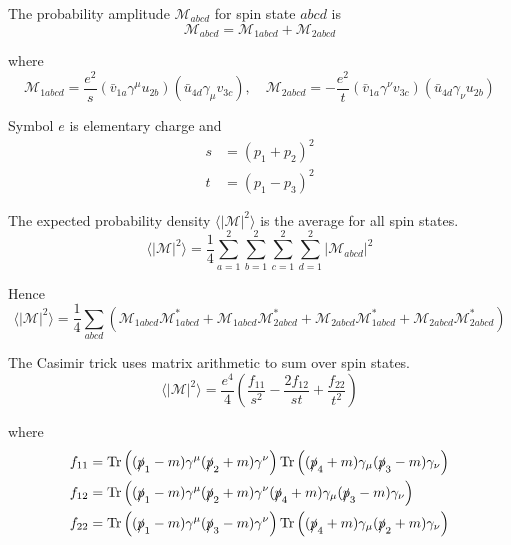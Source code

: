 The probability amplitude $\mathcal M_{abcd}$ for spin state $abcd$ is
\begin{equation*}
\mathcal M_{abcd}=\mathcal M_{1abcd}+\mathcal M_{2abcd}
\end{equation*}

where
\begin{equation*}
\mathcal M_{1abcd}=\frac{e^2}{s}(\bar v_{1a}\gamma^\mu u_{2b})(\bar u_{4d}\gamma_\mu v_{3c}),
\quad
\mathcal M_{2abcd}=-\frac{e^2}{t}(\bar v_{1a}\gamma^\nu v_{3c})(\bar u_{4d}\gamma_\nu u_{2b})
\end{equation*}

Symbol $e$ is elementary charge and
\begin{align*}
s&=(p_1+p_2)^2
\\
t&=(p_1-p_3)^2
\end{align*}

The expected probability density $\langle|\mathcal M|^2\rangle$
is the average for all spin states.
\begin{equation*}
\langle|\mathcal M|^2\rangle=\frac{1}{4}
\sum_{a=1}^2\sum_{b=1}^2\sum_{c=1}^2\sum_{d=1}^2
|\mathcal M_{abcd}|^2
\end{equation*}

Hence
\begin{equation*}
\langle|\mathcal{M}|^2\rangle=\frac{1}{4}
\sum_{abcd}
\left(
\mathcal M_{1abcd}\mathcal M_{1abcd}^*
+\mathcal M_{1abcd}\mathcal M_{2abcd}^*
+\mathcal M_{2abcd}\mathcal M_{1abcd}^*
+\mathcal M_{2abcd}\mathcal M_{2abcd}^*
\right)
\end{equation*}

The Casimir trick uses matrix arithmetic to sum over spin states.
\begin{equation*}
\langle|\mathcal{M}|^2\rangle
=\frac{e^4}{4}
\left(
\frac{f_{11}}{s^2}-\frac{2f_{12}}{st}+\frac{f_{22}}{t^2}
\right)
\end{equation*}

where
\begin{align*}
f_{11}&=\operatorname{Tr}\left(
(\slashed p_1-m)\gamma^\mu(\slashed p_2+m)\gamma^\nu
\right)
\operatorname{Tr}\left(
(\slashed p_4+m)\gamma_\mu(\slashed p_3-m)\gamma_\nu
\right)
\\
f_{12}&=\operatorname{Tr}\left(
(\slashed p_1-m)\gamma^\mu(\slashed p_2+m)\gamma^\nu
(\slashed p_4+m)\gamma_\mu(\slashed p_3-m)\gamma_\nu
\right)
\\
f_{22}&=\operatorname{Tr}\left(
(\slashed p_1-m)\gamma^\mu(\slashed p_3-m)\gamma^\nu
\right)
\operatorname{Tr}\left(
(\slashed p_4+m)\gamma_\mu(\slashed p_2+m)\gamma_\nu
\right)
\end{align*}

